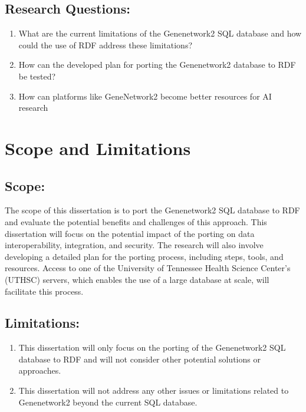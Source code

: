 \subsection*{Research Questions:}

\begin{enumerate}
\item What are the current limitations of the Genenetwork2 SQL database and how could the use of RDF address these limitations?
\item How can the developed plan for porting the Genenetwork2 database to RDF be tested?
\item How can platforms like GeneNetwork2 become better resources for AI research
\end{enumerate}


\section{Scope and Limitations}
\subsection*{Scope:}

The scope of this dissertation is to port the Genenetwork2 SQL database to RDF and evaluate the potential benefits and challenges of this approach.  This dissertation will focus on the potential impact of the porting on data interoperability, integration, and security.  The research will also involve developing a detailed plan for the porting process, including steps, tools, and resources.  Access to one of the University of Tennessee Health Science Center's (UTHSC) servers, which enables the use of a large database at scale, will facilitate this process.

\subsection*{Limitations:}

\begin{enumerate}
\item This dissertation will only focus on the porting of the Genenetwork2 SQL database to RDF and will not consider other potential solutions or approaches.
\item This dissertation will not address any other issues or limitations related to Genenetwork2 beyond the current SQL database.
\end{enumerate}
